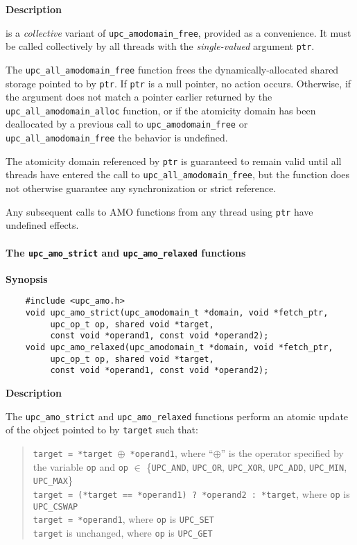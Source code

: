 {\bf Description}

 is a \emph{collective} variant of
    {\tt upc\_amodomain\_free}, provided as a convenience.  It must be called
    collectively by all threads with the \emph{single-valued} argument
    {\tt ptr}.

\np The {\tt upc\_all\_amodomain\_free} function frees the dynamically-allocated
    shared storage pointed to by {\tt ptr}.  If {\tt ptr} is a null pointer,
    no action occurs.  Otherwise, if the argument does not match a pointer
    earlier returned by the {\tt upc\_all\_amodomain\_alloc} function, or if
    the atomicity domain has been deallocated by a previous call to
    {\tt upc\_amodomain\_free} or {\tt upc\_all\_amodomain\_free} the
    behavior is undefined.

\np The atomicity domain referenced by {\tt ptr} is guaranteed to remain valid
    until all threads have entered the call to {\tt upc\_all\_amodomain\_free},
    but the function does not otherwise guarantee any synchronization or
    strict reference.

\np Any subsequent calls to AMO functions from any thread using {\tt ptr} have
    undefined effects.

\paragraph{The {\tt upc\_amo\_strict} and {\tt upc\_amo\_relaxed} functions}

{\bf Synopsis}

\npf\vspace{-1.8em}
\begin{verbatim}
    #include <upc_amo.h>
    void upc_amo_strict(upc_amodomain_t *domain, void *fetch_ptr,
         upc_op_t op, shared void *target,
         const void *operand1, const void *operand2);
    void upc_amo_relaxed(upc_amodomain_t *domain, void *fetch_ptr,
         upc_op_t op, shared void *target,
         const void *operand1, const void *operand2);
\end{verbatim}

{\bf Description}

\np The {\tt upc\_amo\_strict} and {\tt upc\_amo\_relaxed} functions perform
    an atomic update of the object pointed to by {\tt target} such that:

    \begin{verse}
      {\tt *target = *target $\oplus$ *operand1},
        where ``$\oplus$'' is the operator specified by the variable {\tt op}
        and {\tt op} $\in$ \{{\tt UPC\_AND}, {\tt UPC\_OR}, {\tt UPC\_XOR},
        {\tt UPC\_ADD}, {\tt UPC\_MIN}, {\tt UPC\_MAX}\} \\
      {\tt *target = (*target == *operand1) ? *operand2 : *target},
        where {\tt op} is {\tt UPC\_CSWAP} \\
      {\tt *target = *operand1},
        where {\tt op} is {\tt UPC\_SET} \\
      {\tt *target} is unchanged,
        where {\tt op} is {\tt UPC\_GET} \\
    \end{verse}

